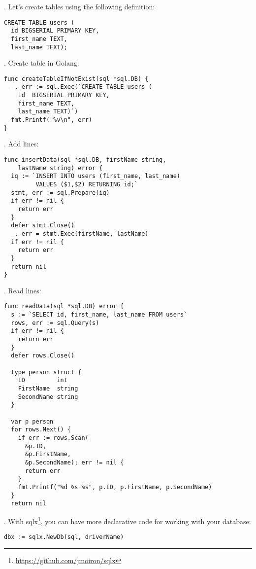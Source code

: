 \documentclass[11pt, letterpaper]{article}
\begin{document}
. Let's create tables using the following definition:

\begin{verbatim}
CREATE TABLE users (
  id BIGSERIAL PRIMARY KEY,
  first_name TEXT,
  last_name TEXT);
\end{verbatim}

. Create table in Golang:

\begin{verbatim}
func createTableIfNotExist(sql *sql.DB) {
  _, err := sql.Exec(`CREATE TABLE users (
    id  BIGSERIAL PRIMARY KEY,
    first_name TEXT,
    last_name TEXT)`)
  fmt.Printf("%v\n", err)
}
\end{verbatim}

. Add lines:

\begin{verbatim}
func insertData(sql *sql.DB, firstName string,
    lastName string) error {
  iq := `INSERT INTO users (first_name, last_name)
         VALUES ($1,$2) RETURNING id;`
  stmt, err := sql.Prepare(iq)
  if err != nil {
    return err
  }
  defer stmt.Close()
  _, err = stmt.Exec(firstName, lastName)
  if err != nil {
    return err
  }
  return nil
}
\end{verbatim}


. Read lines:

\begin{verbatim}
func readData(sql *sql.DB) error {
  s := `SELECT id, first_name, last_name FROM users`
  rows, err := sql.Query(s)
  if err != nil {
    return err
  }
  defer rows.Close()

  type person struct {
    ID         int
    FirstName  string
    SecondName string
  }

  var p person
  for rows.Next() {
    if err := rows.Scan(
      &p.ID,
      &p.FirstName,
      &p.SecondName); err != nil {
      return err
    }
    fmt.Printf("%d %s %s", p.ID, p.FirstName, p.SecondName)
  }
  return nil
\end{verbatim}

. With sqlx\footnote{\href{https://github.com/jmoiron/sqlx}{https://github.com/jmoiron/sqlx}}, you can have more declarative code for working with your database:

\begin{verbatim}
dbx := sqlx.NewDb(sql, driverName)
\end{verbatim}
\end{document}

